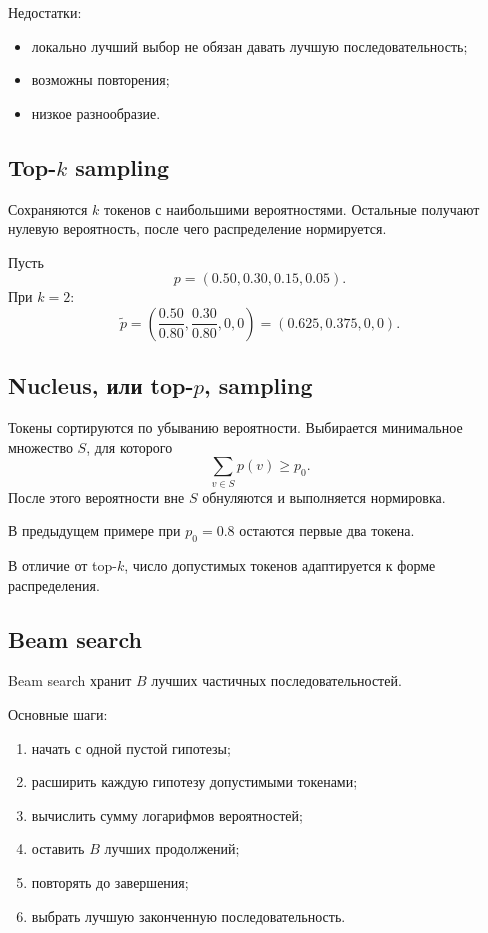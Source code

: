 \documentclass[12pt,a4paper]{article}
\newcommand{\1}{\mathbf{1}}
\theoremstyle{definition}
\theoremstyle{remark}
\begin{document}
Недостатки:

\begin{itemize}
    \item локально лучший выбор не обязан давать лучшую последовательность;
    \item возможны повторения;
    \item низкое разнообразие.
\end{itemize}

\subsection{Top-$k$ sampling}

Сохраняются $k$ токенов с наибольшими вероятностями. Остальные получают
нулевую вероятность, после чего распределение нормируется.

Пусть
\[
p=(0.50,0.30,0.15,0.05).
\]
При $k=2$:
\[
\widetilde{p}
=
\left(
\frac{0.50}{0.80},
\frac{0.30}{0.80},
0,
0
\right)
=
(0.625,0.375,0,0).
\]

\subsection{Nucleus, или top-$p$, sampling}

Токены сортируются по убыванию вероятности. Выбирается минимальное
множество $S$, для которого
\[
\sum_{v\in S}p(v)\geq p_0.
\]
После этого вероятности вне $S$ обнуляются и выполняется нормировка.

В предыдущем примере при $p_0=0.8$ остаются первые два токена.

В отличие от top-$k$, число допустимых токенов адаптируется к форме
распределения.

\subsection{Beam search}

Beam search хранит $B$ лучших частичных последовательностей.

Основные шаги:

\begin{enumerate}
    \item начать с одной пустой гипотезы;
    \item расширить каждую гипотезу допустимыми токенами;
    \item вычислить сумму логарифмов вероятностей;
    \item оставить $B$ лучших продолжений;
    \item повторять до завершения;
    \item выбрать лучшую законченную последовательность.
\end{enumerate}
\end{document}
